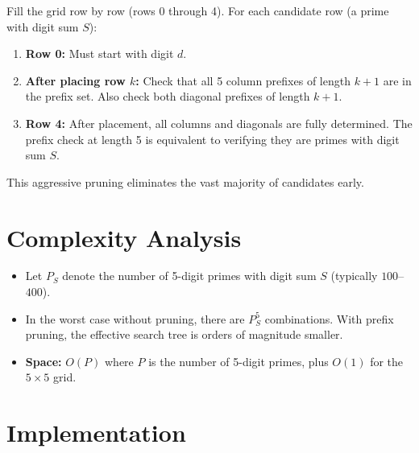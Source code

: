 \documentclass[11pt,a4paper]{article}
\begin{document}
Fill the grid row by row (rows 0 through 4). For each candidate row (a prime
with digit sum $S$):

\begin{enumerate}
  \item \textbf{Row 0:} Must start with digit $d$.
  \item \textbf{After placing row $k$:} Check that all 5 column prefixes
    of length $k+1$ are in the prefix set. Also check both diagonal prefixes
    of length $k+1$.
  \item \textbf{Row 4:} After placement, all columns and diagonals are
    fully determined. The prefix check at length 5 is equivalent to verifying
    they are primes with digit sum $S$.
\end{enumerate}

This aggressive pruning eliminates the vast majority of candidates early.

\section{Complexity Analysis}

\begin{itemize}
  \item Let $P_S$ denote the number of 5-digit primes with digit sum $S$
    (typically $100$--$400$).
  \item In the worst case without pruning, there are $P_S^5$ combinations.
    With prefix pruning, the effective search tree is orders of magnitude
    smaller.
  \item \textbf{Space:} $O(P)$ where $P$ is the number of 5-digit primes,
    plus $O(1)$ for the $5 \times 5$ grid.
\end{itemize}

\section{Implementation}
\end{document}
